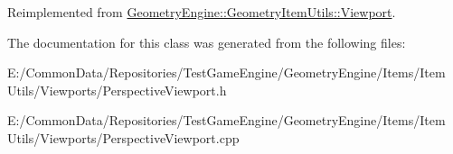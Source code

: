 Reimplemented from \mbox{\hyperlink{class_geometry_engine_1_1_geometry_item_utils_1_1_viewport_aee56ad377f9615e64c33bdef3d05c94f}{Geometry\+Engine\+::\+Geometry\+Item\+Utils\+::\+Viewport}}.



The documentation for this class was generated from the following files\+:\begin{DoxyCompactItemize}
\item 
E\+:/\+Common\+Data/\+Repositories/\+Test\+Game\+Engine/\+Geometry\+Engine/\+Items/\+Item Utils/\+Viewports/Perspective\+Viewport.\+h\item 
E\+:/\+Common\+Data/\+Repositories/\+Test\+Game\+Engine/\+Geometry\+Engine/\+Items/\+Item Utils/\+Viewports/Perspective\+Viewport.\+cpp\end{DoxyCompactItemize}
